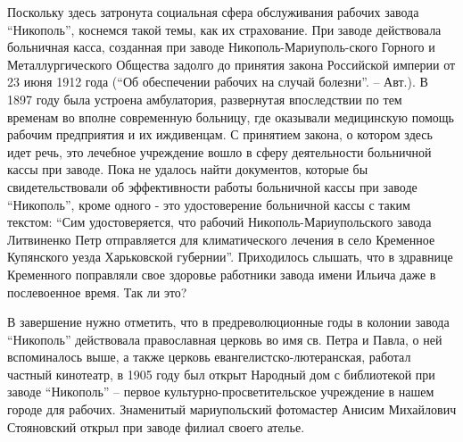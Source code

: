 Поскольку здесь затронута социальная сфера обслуживания  рабочих завода
\enquote{Никополь}, коснемся такой темы, как их страхование. При заводе действовала
больничная касса, созданная при заводе Никополь-Мариуполь\hyp{}ского Горного и
Металлургического Общества задолго до принятия закона Российской империи от 23
июня 1912 года (\enquote{Об обеспечении рабочих на случай болезни}. – Авт.). В 1897
году была устроена амбулатория, развернутая впоследствии по тем временам во
вполне современную больницу, где оказывали медицинскую помощь рабочим
предприятия и их иждивенцам. С принятием закона, о котором  здесь идет речь,
это лечебное учреждение вошло в сферу деятельности больничной кассы при заводе.
Пока не удалось найти документов, которые бы свидетельствовали об эффективности
работы больничной кассы при заводе \enquote{Никополь}, кроме одного - это удостоверение
больничной кассы с таким текстом: \enquote{Сим удостоверяется, что рабочий
Никополь-Мариупольского завода Литвиненко Петр отправляется для климатического
лечения в село Кременное Купянского уезда Харьковской губернии}. Приходилось
слышать, что в здравнице Кременного поправляли свое здоровье работники завода
имени Ильича даже в послевоенное время. Так ли это?

В завершение нужно отметить, что в предреволюционные годы в колонии завода
\enquote{Никополь} действовала православная церковь во имя св. Петра и Павла, о ней
вспоминалось выше, а также церковь евангелистско-лютеранская, работал частный
кинотеатр, в 1905 году  был открыт Народный дом с библиотекой при заводе
\enquote{Никополь} – первое культурно-просветительское учреждение в нашем городе для
рабочих. Знаменитый мариупольский фотомастер Анисим Михайлович Стояновский
открыл при заводе филиал своего ателье. 
